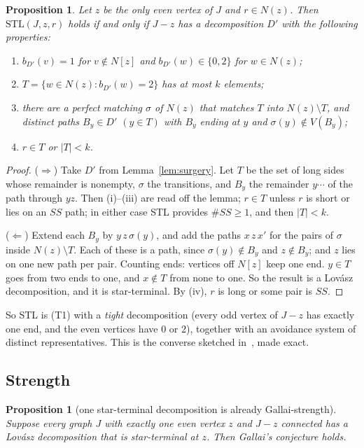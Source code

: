 \documentclass[11pt]{amsart}
\newtheorem{proposition}[theorem]{Proposition}
\theoremstyle{definition}
\newcommand{\STL}{\mathrm{STL}}
\begin{document}
\begin{proposition}\label{prop:J-z}
Let $z$ be the only even vertex of $J$ and $r\in N(z)$. Then $\STL(J,z,r)$ holds if and only if
$J-z$ has a decomposition $D'$ with the following properties:
\begin{enumerate}[label=\textup{(\roman*)}]
\item $b_{D'}(v)=1$ for $v\notin N[z]$ and $b_{D'}(w)\in\{0,2\}$ for $w\in N(z)$;
\item $T=\{w\in N(z):b_{D'}(w)=2\}$ has at most $k$ elements;
\item there are a perfect matching $\sigma$ of $N(z)$ that matches $T$ into $N(z)\setminus T$, and
distinct paths $B_y\in D'$ $(y\in T)$ with $B_y$ ending at $y$ and $\sigma(y)\notin V(B_y)$;
\item $r\in T$ or $|T|<k$.
\end{enumerate}
\end{proposition}

\begin{proof}
($\Rightarrow$) Take $D'$ from Lemma~\ref{lem:surgery}. Let $T$ be the set of long sides whose
remainder is nonempty, $\sigma$ the transitions, and $B_y$ the remainder $y\cdots$ of the path
through $yz$. Then (i)--(iii) are read off the lemma; $r\in T$ unless $r$ is short or lies on an
$SS$ path; in either case STL provides $\#SS\ge1$, and then $|T|<k$.

($\Leftarrow$) Extend each $B_y$ by $y\,z\,\sigma(y)$, and add the paths $x\,z\,x'$ for the pairs of
$\sigma$ inside $N(z)\setminus T$. Each of these is a path, since $\sigma(y)\notin B_y$ and
$z\notin B_y$; and $z$ lies on one new path per pair. Counting ends: vertices off $N[z]$ keep one
end. $y\in T$ goes from two ends to one, and $x\notin T$ from none to one. So the result is a
Lov\'asz decomposition, and it is star-terminal. By (iv), $r$ is long or some pair is $SS$.
\end{proof}

So STL is (T1) with a \emph{tight} decomposition (every odd vertex of $J-z$ has exactly one end,
and the even vertices have $0$ or $2$), together with an avoidance system of distinct
representatives. This is the converse sketched in~\cite[\S19]{SYN}, made exact.

\subsection{Strength}

\begin{proposition}[one star-terminal decomposition is already Gallai-strength]\label{prop:cone}
Suppose every graph $J$ with exactly one even vertex $z$ and $J-z$ connected has a Lov\'asz
decomposition that is star-terminal at $z$. Then Gallai's conjecture holds.
\end{proposition}
\end{document}
